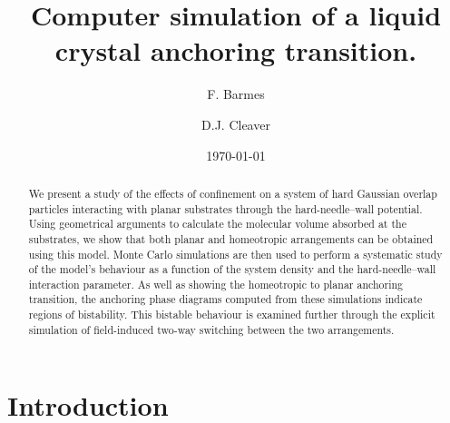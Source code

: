 \documentclass[aps,10pt,twocolumn]{revtex4}
\begin{document}
\graphicspath
{
{../imgs/}
}

\title{Computer simulation of a liquid crystal anchoring transition.}

\author{F. Barmes}


\author{D.J. Cleaver}





\date{\today}



\begin{abstract}
We present a study of the effects of confinement on a system of hard Gaussian overlap particles interacting with
planar substrates through the hard-needle--wall potential. Using geometrical arguments to calculate the molecular
volume absorbed at the substrates, we show that both planar and homeotropic arrangements can be obtained using
this model. Monte Carlo simulations are then used to perform a systematic study of the model's behaviour as a
function of the system density and the hard-needle--wall interaction parameter. As well as showing the homeotropic
to planar anchoring transition, the anchoring phase diagrams computed from these simulations indicate regions of
bistability. This bistable behaviour is examined further through the explicit simulation of field-induced two-way
switching between the two arrangements.
\end{abstract}
\maketitle

\section{Introduction}
\end{document}
